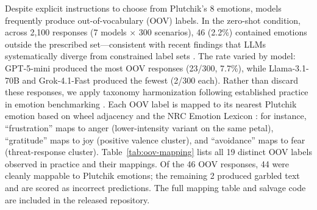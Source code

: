\documentclass[twoside,11pt]{article}
\begin{document}
Despite explicit instructions to choose from Plutchik's 8 emotions, models frequently produce out-of-vocabulary (OOV) labels. In the zero-shot condition, across 2,100 responses (7 models $\times$ 300 scenarios), 46 (2.2\%) contained emotions outside the prescribed set---consistent with recent findings that LLMs systematically diverge from constrained label sets \citep{niu2024rethinking}. The rate varied by model: GPT-5-mini produced the most OOV responses (23/300, 7.7\%), while Llama-3.1-70B and Grok-4.1-Fast produced the fewest (2/300 each). Rather than discard these responses, we apply taxonomy harmonization following established practice in emotion benchmarking \citep{lian2024mer,demszky2020goemotions}. Each OOV label is mapped to its nearest Plutchik emotion based on wheel adjacency and the NRC Emotion Lexicon \citep{mohammad2012semeval}: for instance, ``frustration'' maps to anger (lower-intensity variant on the same petal), ``gratitude'' maps to joy (positive valence cluster), and ``avoidance'' maps to fear (threat-response cluster). Table~\ref{tab:oov-mapping} lists all 19 distinct OOV labels observed in practice and their mappings. Of the 46 OOV responses, 44 were cleanly mappable to Plutchik emotions; the remaining 2 produced garbled text and are scored as incorrect predictions. The full mapping table and salvage code are included in the released repository.
\end{document}
